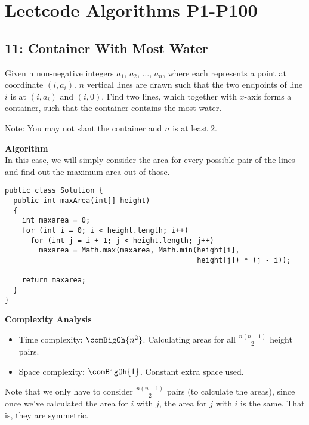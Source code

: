 \chapter[Leetcode Algorithms P1-P100]
{Leetcode Algorithms P1-P100
  \label{chLCP1P100}}



\section{11: Container With Most Water\label{secLCP11CntnrWthMstWtr}}

Given n non-negative integers $a_1$, $a_2$, $\ldots$, $a_n$, where each
represents a point at coordinate $(i,a_i)$. $n$ vertical lines are drawn
such that the two endpoints of line $i$ is at $(i,a_i)$ and $(i,0)$. Find
two lines, which together with $x$-axis forms a container, such that the
container contains the most water.

Note: You may not slant the container and $n$ is at least $2$.

\rrsepline{}


\noindent{}\textbf{Algorithm}\\
In this case, we will simply consider the area for every possible pair of
the lines and find out the maximum area out of those.
\begin{lstlisting}[style=raycppnewsnippet]
public class Solution {
  public int maxArea(int[] height) 
  {
    int maxarea = 0;
    for (int i = 0; i < height.length; i++)
      for (int j = i + 1; j < height.length; j++)
        maxarea = Math.max(maxarea, Math.min(height[i],
                                             height[j]) * (j - i));
    
    return maxarea;
  }
}
\end{lstlisting}

\noindent{}\textbf{Complexity Analysis}\\
\begin{itemize}%
\item Time complexity: $\comBigOh{n^2}$. Calculating areas for all
  $\displaystyle \frac{n(n-1)}{2}$ height pairs.
\item Space complexity: $\comBigOh{1}$. Constant extra space used.
\end{itemize}

Note that we only have to consider $\frac{n(n-1)}{2}$ pairs (to calculate
the areas), since once we've calculated the area for $i$ with $j$, the area
for $j$ with $i$ is the same.  That is, they are symmetric.

